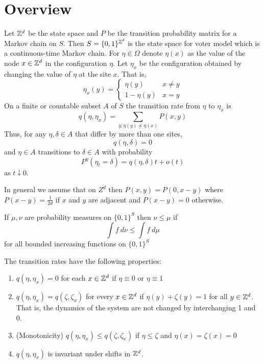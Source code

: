 \section{Overview}

\begin{defn} \cite{Liggett2002}
Let $\mathbb{Z}^d$ be the state space and $P$ be the transition probability matrix for a Markov chain on $S$.
Then $S = \{0,1\}^{\mathbb{Z}^d}$ is the state space for voter model which is a continuous-time Markov chain.
For $\eta \in \Omega$ denote $\eta(x)$ as the value of the node $x \in \mathbb{Z}^d$ in the configuration $\eta$.
Let $\eta_x$ be the configuration obtained by changing the value of $\eta$ at the site $x$. That is,
$$
\eta_x(y) = \begin{cases}
    \eta(y) & x \not = y\\
    1 - \eta(y) & x = y
\end{cases}
$$
On a finite or countable subset $A$ of $S$
the transition rate from $\eta$ to $\eta_x$ is
$$
q(\eta, \eta_x) = \sum_{y : \eta(y) \not = \eta(x)} P(x,y)
$$
Thus, for any $\eta, \delta \in A$ that differ by more than one sites,
$$
q(\eta, \delta) = 0
$$
and $\eta \in A$ transitions to $\delta \in A$ with probability
$$
P^\eta(\eta_t = \delta) = q(\eta, \delta) t + o(t)
$$
as $t \downarrow 0$.

In general we assume that on $Z^d$ then $P(x,y) = P(0, x - y)$
where $P(x- y) = \frac{1}{2d}$ if $x$ and $y$ are adjacent and $P(x-y) = 0$ otherwise.
\end{defn}

\begin{defn} \cite{Liggett1999}
If $\mu, \nu$ are probability measures on $\{0,1\}^S$ then $\nu \leq \mu$ if
$$
\int f~d\nu \leq \int f~d\mu
$$
for all bounded increasing functions on $\{0,1\}^S$
\end{defn}

\begin{theorem}
The transition rates have the following properties:
\begin{enumerate}
    \item $q(\eta, \eta_x) = 0$ for each $x \in \mathbb{Z}^d$ if $\eta \equiv 0$ or $\eta \equiv 1$
    \item $q(\eta, \eta_x) = q(\zeta, \zeta_x)$ for every $x \in \mathbb{Z}^d$ if $\eta(y) + \zeta(y) = 1$ for all $y \in \mathbb{Z}^d$. That is, the dynamics of the system are not changed by interchanging 1 and 0.
    \item (Monotonicity) $q(\eta, \eta_x) \leq q(\zeta, \zeta_x)$ if $\eta \leq \zeta$ and $\eta(x) = \zeta(x) = 0$
    \item $q(\eta, \eta_x)$ is invariant under shifts in $\mathbb{Z}^d$.
\end{enumerate}
\end{theorem}

